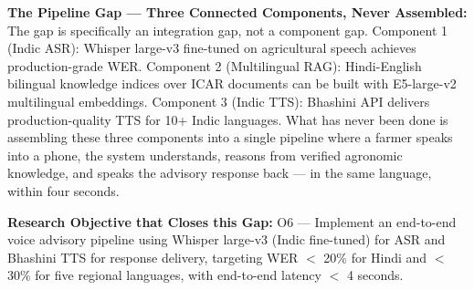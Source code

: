 \documentclass[12pt,a4paper]{article}
\begin{document}
\noindent\textbf{The Pipeline Gap --- Three Connected Components, Never Assembled:}
The gap is specifically an integration gap, not a component gap. Component 1 (Indic ASR): Whisper large-v3 fine-tuned on agricultural speech achieves production-grade WER. Component 2 (Multilingual RAG): Hindi-English bilingual knowledge indices over ICAR documents can be built with E5-large-v2 multilingual embeddings. Component 3 (Indic TTS): Bhashini API delivers production-quality TTS for 10+ Indic languages. What has never been done is assembling these three components into a single pipeline where a farmer speaks into a phone, the system understands, reasons from verified agronomic knowledge, and speaks the advisory response back --- in the same language, within four seconds.

\noindent\textbf{Research Objective that Closes this Gap:}
O6 --- Implement an end-to-end voice advisory pipeline using Whisper large-v3 (Indic fine-tuned) for ASR and Bhashini TTS for response delivery, targeting WER $<$ 20\% for Hindi and $<$ 30\% for five regional languages, with end-to-end latency $<$ 4 seconds.
\end{document}
